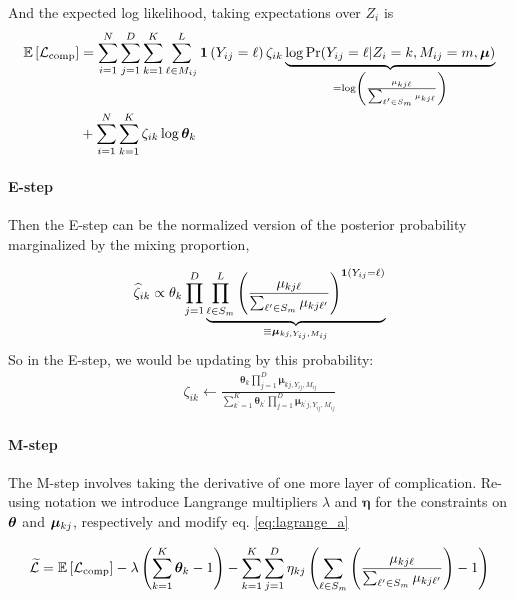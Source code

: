 \documentclass[11pt]{article}
\begin{document}
And the expected log likelihood, taking expectations over \(Z_i\) is 
\begin{align}
\mathbb{E}\left[\mathcal{L}_{\text{comp}}\right] &= \sum^{N}_{i=1}\sum^{D}_{j=1}\sum^{K}_{k=1}\sum^{L}_{\ell \in M_{ij}}\bm{1}\left(Y_{ij} = \ell\right)\zeta_{ik}\underbrace{\log \Pr(Y_{ij} = \ell | Z_{i} = k, M_{ij} = m, \bm{\mu})}_{=\log \left(\frac{\mu_{kj\ell}}{\sum_{\ell^\prime \in S_{m}} \mu_{kj\ell}}\right)}\nonumber\\
& + \sum^{N}_{i=1}\sum^{K}_{k=1}\zeta_{ik}\log \bm{\theta}_{k}
\end{align}

\paragraph{E-step} Then the E-step can be the normalized version of the posterior probability marginalized by the mixing proportion,

\begin{align}
\widehat{\zeta}_{ik} \propto \theta_k\prod^{D}_{j = 1}\underbrace{\prod^{L}_{\ell \in S_m}\left(\frac{\mu_{kj\ell}}{\sum_{\ell^\prime \in S_{m}} \mu_{kj\ell^\prime}}\right)^{\bm{1}\left(Y_{ij} = \ell\right)}}_{\equiv \bm{\mu}_{kj, Y_{ij}, M_{ij}}}
\end{align}
So in the E-step, we would be updating by this probability:
\begin{align}
\zeta_{ik} \leftarrow \frac{\bm{\theta}_{k}\prod^{D}_{j=1}\bm{\mu}_{kj,Y_{ij}, M_{ij}}}
{\sum^{K}_{k^\prime=1}\bm{\theta}_{k^\prime}\prod^{D}_{j=1}\bm{\mu}_{k^\prime j,Y_{ij}, M_{ij}}}
\end{align}

\paragraph{M-step}  The M-step involves taking the derivative of one more layer of complication. Re-using notation we introduce Langrange multipliers \(\lambda\) and \(\bm{\eta}\) for the constraints on \(\bm{\theta}\) and \(\bm{\mu}_{kj}\), respectively and modify eq. \ref{eq:lagrange_a}

\begin{align}
\widetilde{\mathcal{L}} = \mathbb{E}\left[\mathcal{L}_\text{comp}\right] - \lambda\left(\sum^{K}_{k=1}\bm{\theta}_k - 1\right) - \sum^{K}_{k=1}\sum^{D}_{j=1}\eta_{kj}\left(\sum_{\ell \in S_{m}}\left(\frac{\mu_{kj\ell}}{\sum_{\ell^\prime \in S_{m}} \mu_{kj\ell^\prime}}\right) - 1\right) \nonumber
\end{align}
\end{document}
